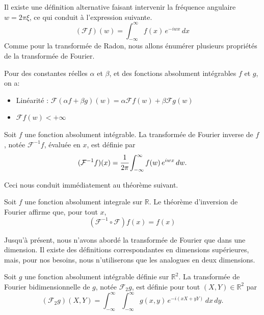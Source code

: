 Il existe une définition alternative faisant intervenir la fréquence angulaire $w=2\pi \xi$, ce qui conduit à l'expression suivante.
\begin{equation}(\mathcal{F}f)(w) = \int_{-\infty}^{\infty} f(x)\, e^{-i w x}\, dx\end{equation}
Comme pour la transformée de Radon, nous allons énumérer plusieurs propriétés de la transformée de Fourier.
\begin{proposition}
    Pour des constantes réelles $\alpha$ et $\beta$, et des fonctions absolument intégrables $f$ et $g$, on a:
    \begin{itemize}
        \item[(i)] Linéarité : $\mathcal{F}(\alpha f + \beta g)(w) = \alpha \mathcal{F}f(w) + \beta \mathcal{F}g(w)$
        \item[(ii)] $\mathcal{F}f(w) < +\infty$
    \end{itemize}
\end{proposition}

\begin{definition}
Soit \( f \) une fonction absolument intégrable.
La transformée de Fourier inverse de \( f \), notée \( \mathcal{F}^{-1}f \),
évaluée en \( x \), est définie par
\begin{equation}
    (\mathcal{F}^{-1}f)(x)
    = \cfrac{1}{2\pi}\int_{-\infty}^{\infty} f(w)\, e^{iw x}\, dw.
    \label{formula:fourier_inverse}
\end{equation}
\end{definition}
Ceci nous conduit immédiatement au théorème suivant.
\begin{proposition}
Soit $f$ une fonction absolument integrale sur $\mathbb{R}$.
Le théorème d'inversion de Fourier affirme que, pour tout \( x \),
\begin{equation}
(\mathcal{F}^{-1} \circ \mathcal{F})f(x)=f(x)
\end{equation}
\end{proposition}
Jusqu'à présent, nous n'avons abordé la transformée de Fourier que dans une dimension. Il existe des définitions correspondantes en dimensions supérieures, mais, pour nos besoins, nous n'utiliserons que les analogues en deux dimensions.

\begin{definition}
Soit \( g \) une fonction absolument intégrable définie sur \( \mathbb{R}^2 \).
La transformée de Fourier bidimensionnelle de \( g \), notée \( \mathcal{F}_2 g \),
est définie pour tout \((X,Y) \in \mathbb{R}^2\) par
\begin{equation}
    (\mathcal{F}_2 g)(X,Y) = \int_{-\infty}^{\infty} \int_{-\infty}^{\infty} 
    g(x,y)\, e^{-i (xX + yY)} \, dx\, dy.
    \label{eq:fourier_2d}
\end{equation}

\end{definition}

